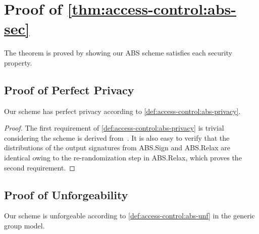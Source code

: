 \chapter{Proof of \texorpdfstring{\cref*{thm:access-control:abs-sec}}{Theorem~\ref{thm:access-control:abs-sec}}}%
\label{app:access-control-abs-sec}

\abssecuritytheorem*

The theorem is proved by showing our ABS scheme satisfies each security property.

\section{Proof of Perfect Privacy}

\begin{lemma}\label{lemma:access-control:abs-privacy}
  Our scheme has perfect privacy according to \cref{def:access-control:abs-privacy}.
\end{lemma}

\begin{proof}
  The first requirement of \cref{def:access-control:abs-privacy} is trivial considering the scheme is derived from~\cite{10.1007/978-3-642-19074-2_24}. It is also easy to verify that the distributions of the output signatures from \textsf{ABS.Sign} and \textsf{ABS.Relax} are identical owing to the re-randomization step in \textsf{ABS.Relax}, which proves the second requirement.
\end{proof}

\section{Proof of Unforgeability}

\begin{lemma}\label{lemma:access-control:abs-unf}
  Our scheme is unforgeable according to \cref{def:access-control:abs-unf} in the generic group model.
\end{lemma}

\newcommand{\Lin}{\textsf{Lin}}
\newcommand{\Hom}{\textsf{Hom}}

